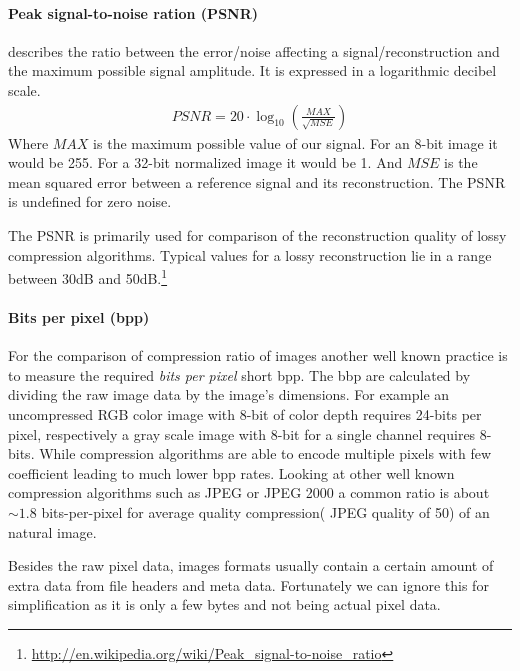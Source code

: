 \paragraph{Peak signal-to-noise ration (PSNR)} describes the ratio between the
error/noise affecting a signal/reconstruction and the maximum possible signal
amplitude. It is expressed in a logarithmic decibel scale.
\begin{align}
 PSNR = 20 \cdot \log_{10} \left(\frac{MAX}{\sqrt{MSE}}\right)
\end{align}
Where $MAX$ is the maximum possible value of our signal. For an 8-bit
image it would be 255. For a 32-bit normalized image it would be 1. And $MSE$ is
the mean squared error between a reference signal and its reconstruction. The
PSNR is undefined for zero noise.

The PSNR is primarily used for comparison of the reconstruction quality of
lossy compression algorithms. Typical values for a lossy reconstruction lie in
a range between 30dB and
50dB.\footnote{\url{http://en.wikipedia.org/wiki/Peak_signal-to-noise_ratio}}

\paragraph{Bits per pixel (bpp)} 
For the comparison of compression ratio of images another well known practice is
to measure the required \emph{bits per pixel} short bpp. The bbp are calculated
by dividing the raw image data by the image's dimensions. For example an
uncompressed RGB color image with 8-bit of color depth requires 24-bits per
pixel, respectively a gray scale image with 8-bit for a single channel requires
8-bits. While compression algorithms are able to encode multiple pixels with few
coefficient leading to much lower bpp rates.
Looking at other well known compression algorithms such as JPEG or
JPEG 2000 a common ratio is about $\sim1.8$ bits-per-pixel for average
quality compression( JPEG quality of 50) of an natural image. 

Besides the raw pixel data, images formats usually contain a certain amount
of extra data from file headers and meta data. Fortunately we can ignore this
for simplification as it is only a few bytes and not being actual pixel data.

